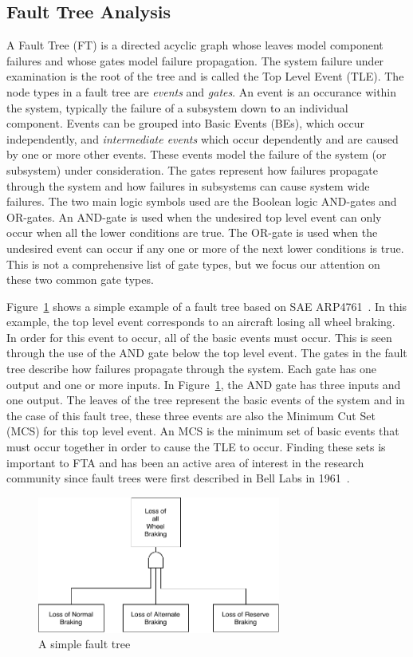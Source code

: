 \subsection{Fault Tree Analysis} A Fault Tree (FT) is a directed acyclic graph whose leaves model component failures and whose gates model failure propagation. The system failure under examination is the root of the tree and is called the Top Level Event (TLE). The node types in a fault tree are \textit{events} and \textit{gates}. An event is an occurance within the system, typically the failure of a subsystem down to an individual component. Events can be grouped into Basic Events (BEs), which occur independently, and \textit{intermediate events} which occur dependently and are caused by one or more other events.  These events model the failure of the system (or subsystem) under consideration. The gates represent how failures propagate through the system and how failures in subsystems can cause system wide failures. The two main logic symbols used are the Boolean logic AND-gates and OR-gates. An AND-gate is used when the undesired top level event can only occur when all the lower conditions are true. The OR-gate is used when the undesired event can occur if any one or more of the next lower conditions is true. This is not a comprehensive list of gate types, but we focus our attention on these two common gate types. 

Figure~\ref{fig:introFT} shows a simple example of a fault tree based on SAE ARP4761~\cite{SAE:ARP4761}. In this example, the top level event corresponds to an aircraft losing all wheel braking. In order for this event to occur, all of the basic events must occur. This is seen through the use of the AND gate below the top level event. The gates in the fault tree describe how failures propagate through the system. Each gate has one output and one or more inputs. In Figure~\ref{fig:introFT}, the AND gate has three inputs and one output. The leaves of the tree represent the basic events of the system and in the case of this fault tree, these three events are also the Minimum Cut Set (MCS) for this top level event. An MCS is the minimum set of basic events that must occur together in order to cause the TLE to occur. Finding these sets is important to FTA and has been an active area of interest in the research community since fault trees were first described in Bell Labs in 1961~\cite{historyFTA,0f356f05e72f43018211b36f97c8854a}. 

\begin{figure}[h]
\begin{center}
\includegraphics[width=8cm]{images/introFT2.pdf}
\caption{A simple fault tree} \label{fig:introFT}
\end{center}
\end{figure}

